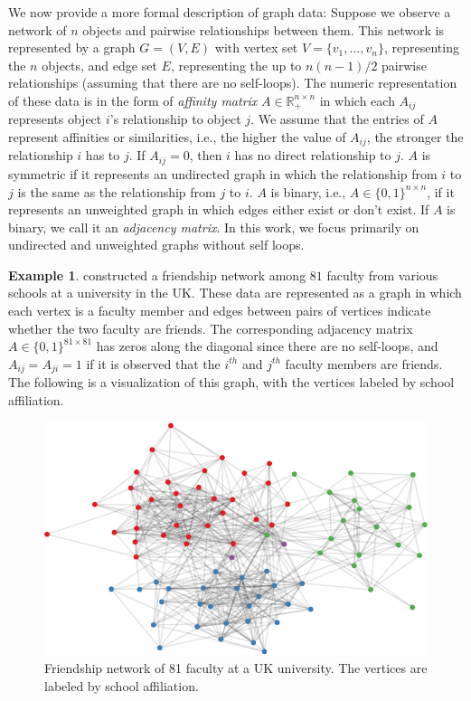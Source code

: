 \documentclass[
  11pt,
]{article}
\theoremstyle{definition}
\theoremstyle{definition}
\newtheorem{example}{Example}[section]
\theoremstyle{definition}
\theoremstyle{definition}
\theoremstyle{remark}
\begin{document}
We now provide a more formal description of graph data:
Suppose we observe a network of \(n\) objects and pairwise relationships between them.
This network is represented by a graph \(G = (V, E)\) with vertex set \(V = \{v_1, ..., v_n\}\), representing the \(n\) objects, and edge set \(E\), representing the up to \(n (n - 1) / 2\) pairwise relationships (assuming that there are no self-loops).
The numeric representation of these data is in the form of \emph{affinity matrix} \(A \in \mathbb{R}_+^{n \times n}\) in which each \(A_{ij}\) represents object \(i\)'s relationship to object \(j\).
We assume that the entries of \(A\) represent affinities or similarities, i.e., the higher the value of \(A_{ij}\), the stronger the relationship \(i\) has to \(j\).
If \(A_{ij} = 0\), then \(i\) has no direct relationship to \(j\).
\(A\) is symmetric if it represents an undirected graph in which the relationship from \(i\) to \(j\) is the same as the relationship from \(j\) to \(i\).
\(A\) is binary, i.e., \(A \in \{0, 1\}^{n \times n}\), if it represents an unweighted graph in which edges either exist or don't exist.
If \(A\) is binary, we call it an \emph{adjacency matrix}.
In this work, we focus primarily on undirected and unweighted graphs without self loops.

\begin{example}
\label{ex:uk-faculty}
\citet{PhysRevE.77.016107} constructed a friendship network among $81$ faculty from various schools at a university in the UK. 
These data are represented as a graph in which each vertex is a faculty member and edges between pairs of vertices indicate whether the two faculty are friends. 
The corresponding adjacency matrix $A \in \{0, 1\}^{81 \times 81}$ has zeros along the diagonal since there are no self-loops, and $A_{ij} = A_{ji} = 1$ if it is observed that the $i^{th}$ and $j^{th}$ faculty members are friends. 
The following is a visualization of this graph, with the vertices labeled by school affiliation. 

\begin{figure}[H]

{\centering \includegraphics{draft_files/figure-latex/friendship-network-1} 

}

\caption{Friendship network of 81 faculty at a UK university. The vertices are labeled by school affiliation.}\label{fig:friendship-network}
\end{figure}
\end{example}
\end{document}
